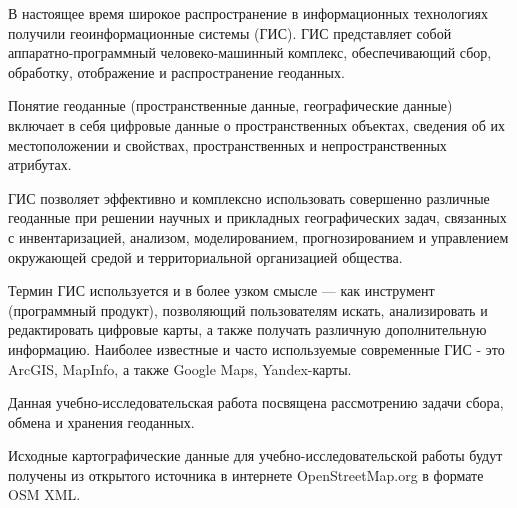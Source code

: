 \documentclass[12pt,a4paper,oneside]{article} %
\begin{document}
\large{

В настоящее время широкое распространение в информационных \linebreak %
технологиях получили геоинформационные системы (ГИС). ГИС  \linebreak %
представляет собой аппаратно-программный человеко-машинный \linebreak %
комплекс, обеспечивающий сбор, обработку, отображение и \linebreak
распространение геоданных.

Понятие геоданные (пространственные данные, географические \linebreak
данные) включает в себя цифровые данные о пространственных \linebreak
объектах, сведения об их местоположении и свойствах, пространственных \linebreak
и непространственных атрибутах.

ГИС позволяет эффективно и комплексно  использовать \linebreak
совершенно различные геоданные при решении научных и прикладных \linebreak
географических задач, связанных с инвентаризацией, анализом, \linebreak
моделированием, прогнозированием и управлением окружающей средой и \linebreak
территориальной организацией общества.

Термин ГИС используется и в более узком смысле — как инструмент \linebreak
(программный продукт), позволяющий пользователям искать, анализировать \linebreak
и редактировать цифровые карты, а также получать различную \linebreak
дополнительную информацию. Наиболее известные и часто используемые\linebreak
современные ГИС - это ArcGIS, MapInfo, а также Google Maps, Yandex-карты.

Данная учебно-исследовательская работа посвящена рассмотрению задачи \linebreak
сбора, обмена и хранения геоданных.

Исходные картографические данные для учебно-исследовательской\linebreak
работы будут получены из открытого источника в интернете \linebreak
OpenStreetMap.org в формате OSM XML.

}
\end{document}
